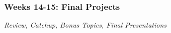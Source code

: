 \documentclass[11pt, letterpaper]{article}
\begin{document}




%

%
%

\subsubsection*{Weeks 14-15: Final Projects}
\textit{Review, Catchup, Bonus Topics, Final Presentations}


\end{document}
